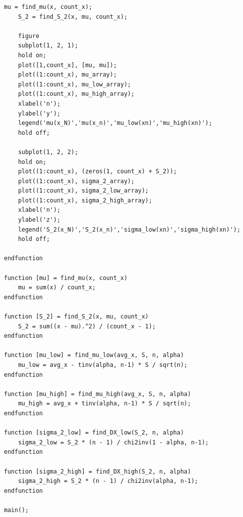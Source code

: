 \begin{lstlisting}[label=lst:code, caption=Модуль разработанных алгоритмов, basicstyle=\footnotesize]
	mu = find_mu(x, count_x);
	S_2 = find_S_2(x, mu, count_x);
	
	figure
	subplot(1, 2, 1);
	hold on;
	plot([1,count_x], [mu, mu]);
	plot((1:count_x), mu_array);
	plot((1:count_x), mu_low_array);
	plot((1:count_x), mu_high_array);
	xlabel('n');
	ylabel('y');
	legend('mu(x_N)','mu(x_n)','mu_low(xn)','mu_high(xn)');
	hold off;
	
	subplot(1, 2, 2);
	hold on;
	plot((1:count_x), (zeros(1, count_x) + S_2));
	plot((1:count_x), sigma_2_array);
	plot((1:count_x), sigma_2_low_array);
	plot((1:count_x), sigma_2_high_array);
	xlabel('n');
	ylabel('z');
	legend('S_2(x_N)','S_2(x_n)','sigma_low(xn)','sigma_high(xn)');
	hold off;

endfunction

function [mu] = find_mu(x, count_x)
	mu = sum(x) / count_x;
endfunction

function [S_2] = find_S_2(x, mu, count_x)
	S_2 = sum((x - mu).^2) / (count_x - 1);
endfunction

function [mu_low] = find_mu_low(avg_x, S, n, alpha)
	mu_low = avg_x - tinv(alpha, n-1) * S / sqrt(n);
endfunction

function [mu_high] = find_mu_high(avg_x, S, n, alpha)
	mu_high = avg_x + tinv(alpha, n-1) * S / sqrt(n);
endfunction

function [sigma_2_low] = find_DX_low(S_2, n, alpha)
	sigma_2_low = S_2 * (n - 1) / chi2inv(1 - alpha, n-1); 
endfunction

function [sigma_2_high] = find_DX_high(S_2, n, alpha)
	sigma_2_high = S_2 * (n - 1) / chi2inv(alpha, n-1); 
endfunction

main();
\end{lstlisting}

\newpage
